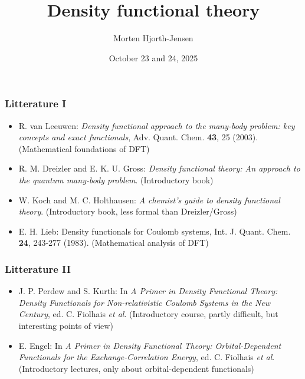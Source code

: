 \documentclass[compress]{beamer}
\title[FYS4480]{Density functional theory}
\author[DFT]{%
  Morten Hjorth-Jensen}
\institute[University of Oslo]{
  Department of Physics and Center for Computing in Science Education\\
  University of Oslo, N-0316 Oslo, Norway}
\date[UiO]{October 23 and 24, 2025}
\begin{document}




\frame{\titlepage}

\frame
{
  \begin{small}
    {\scriptsize
      \frametitle{Litterature I}
      \begin{itemize}
      \item R. van Leeuwen: \emph{Density functional approach to the many-body problem: key concepts and exact functionals}, Adv. Quant. Chem. \textbf{43}, 25 (2003). (Mathematical foundations of DFT)\\
      \item R. M. Dreizler and E. K. U. Gross: \emph{Density functional theory: An approach to the quantum many-body problem}. (Introductory book)\\
      \item W. Koch and M. C. Holthausen: \emph{A chemist's guide to density functional theory}. (Introductory book, less formal than Dreizler/Gross)
      \item E. H. Lieb: Density functionals for Coulomb systems, Int. J. Quant. Chem. \textbf{24}, 243-277 (1983). (Mathematical analysis of DFT) 
      \end{itemize}

    }
  \end{small}
}

\frame
{
  \begin{small}
    {\scriptsize
      \frametitle{Litterature II}
      \begin{itemize}
      \item J. P. Perdew and S. Kurth: In \emph{A Primer in Density Functional Theory: Density Functionals for Non-relativistic Coulomb Systems in the New Century}, ed. C. Fiolhais \emph{et al}. (Introductory course, partly difficult, but interesting points of view) \\
       \item E. Engel: In \emph{A Primer in Density Functional Theory: Orbital-Dependent Functionals for the Exchange-Correlation Energy}, ed. C. Fiolhais \emph{et al}. (Introductory lectures, only about orbital-dependent functionals) \\ 
        
      \end{itemize}

    }
  \end{small}
}
\end{document}
